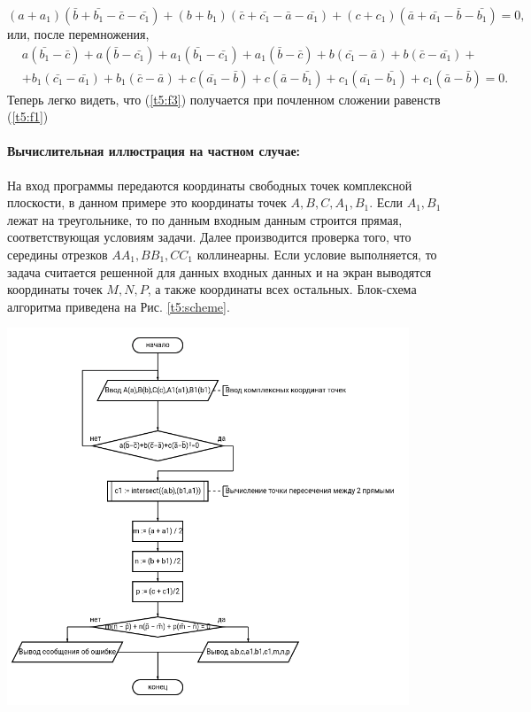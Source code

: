 {   \(
   (a+a_1)(\bar{b}+\bar{b_1}-\bar{c}-\bar{c_1})+(b+b_1 )(\bar{c}+\bar{c_1}-\bar{a}-\bar{a_1})+(c+c_1)(\bar{a}+\bar{a_1}-\bar{b}-\bar{b_1})=0,
   \) или, после перемножения,
   \begin{equation}
      \begin{aligned}
          & a(\bar{b_1} - \bar{c}) + a(\bar{b}- \bar{c_1}) + a_1(\bar{b_1} - \bar{c_1}) + a_1(\bar{b}- \bar{c}) + b(\bar{c_1} - \bar{a}) + b(\bar{c}- \bar{a_1}) + \\
          & +b_1(\bar{c_1}-\bar{a_1})+b_1 (\bar{c}-\bar{a})+c(\bar{a_1}-\bar{b})+c(\bar{a}-\bar{b_1})+c_1 (\bar{a_1}-\bar{b_1} )+c_1(\bar{a}-\bar{b})=0.
      \end{aligned}
      \label{t5:f3}
   \end{equation}
   Теперь легко видеть, что (\ref{t5:f3}) получается при почленном сложении
   равенств (\ref{t5:f1})
   \paragraph{Вычислительная иллюстрация на частном случае:} На вход программы передаются координаты
   свободных точек комплексной плоскости, в данном примере это координаты точек \(A,B,C,A_1,B_1\). Если \(A_1,B_1\)
   лежат на треугольнике, то по данным входным данным строится прямая, соответствующая условиям задачи. Далее
   производится проверка того, что середины отрезков \(AA_1,BB_1,CC_1\) коллинеарны. Если условие выполняется, то задача
   считается решенной для данных входных данных и на экран выводятся координаты точек \(M,N,P\), а также координаты
   всех остальных. Блок-схема алгоритма приведена на Рис. \ref{t5:scheme}.
   \begin{center}
      \includegraphics[width=0.9\textwidth]{images/task5-diagram.png}
      \label{t5:scheme}
   \end{center}

}
